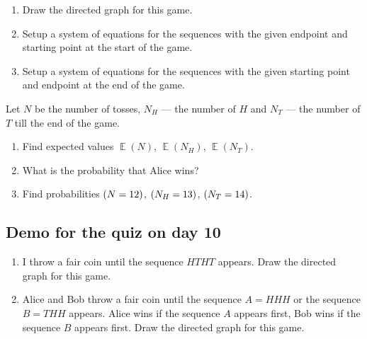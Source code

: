 \documentclass[12pt]{article}
\let\P\relax
\DeclareMathOperator{\P}{\mathbb{P}}
\DeclareMathOperator{\E}{\mathbb{E}}
\begin{document}
\begin{enumerate}
\begin{enumerate}[label=\alph*)]
    \item Draw the directed graph for this game.
    \item Setup a system of equations for the sequences with the given endpoint and starting point at the start of the game. 
    \item Setup a system of equations for the sequences with the given starting point and endpoint at the end of the game. 
\end{enumerate}
Let $N$ be the number of tosses, $N_H$ — the number of $H$ and $N_T$ — the number of $T$ till the end of the game. 
\begin{enumerate}[label=\alph*), resume]
    \item Find expected values $\E(N)$, $\E(N_H)$, $\E(N_T)$.
    \item What is the probability that Alice wins?
    \item Find probabilities $\P(N = 12)$, $\P(N_H = 13)$, $\P(N_T = 14)$.
\end{enumerate}


\end{enumerate}

\subsection*{Demo for the quiz on day 10}

\begin{enumerate} 
    \item I throw a fair coin until the sequence $HTHT$ appears. 
    Draw the directed graph for this game.
    \item Alice and Bob throw a fair coin until the sequence $A = HHH$ or the sequence $B = THH$ appears.
Alice wins if the sequence $A$ appears first, Bob wins if the sequence $B$ appears first.
 Draw the directed graph for this game.
\end{enumerate}
\end{document}
